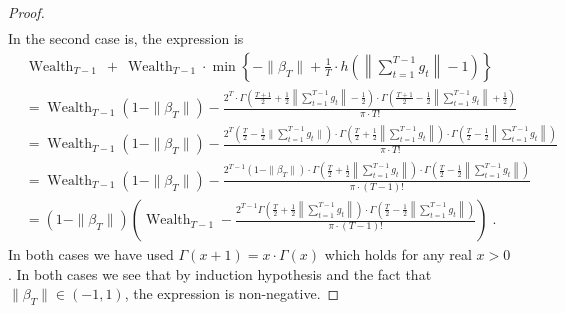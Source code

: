 \documentclass{article}
\DeclareMathOperator{\Wealth}{Wealth}
\begin{document}
\begin{proof}
\begin{align*}
\end{align*}
In the second case is, the expression is
\begin{align*}
& \Wealth_{T-1} \ + \ \Wealth_{T-1} \cdot \min \left\{ - \|\beta_T\| + \frac{1}{T} \cdot h\left(\left\|\sum_{t=1}^{T-1} g_t \right\| - 1 \right) \right\} \\
& = \Wealth_{T-1} (1 - \|\beta_T\|) - \frac{2^T \cdot \Gamma \left(\frac{T+1}{2} + \frac{1}{2}\left\|\sum_{t=1}^{T-1} g_t \right\| - \frac{1}{2} \right) \cdot \Gamma \left(\frac{T+1}{2} - \frac{1}{2} \left\|\sum_{t=1}^{T-1} g_t \right\| + \frac{1}{2} \right)}{\pi \cdot T!} \\
& = \Wealth_{T-1} (1 - \|\beta_T\|) - \frac{2^T \left( \frac{T}{2} - \frac{1}{2}\|\sum_{t=1}^{T-1} g_t\| \right) \cdot \Gamma \left(\frac{T}{2} + \frac{1}{2}\left\|\sum_{t=1}^{T-1} g_t \right\| \right) \cdot \Gamma \left(\frac{T}{2} - \frac{1}{2} \left\|\sum_{t=1}^{T-1} g_t \right\| \right)}{\pi \cdot T!} \\
& = \Wealth_{T-1} (1 - \|\beta_T\|) - \frac{2^{T-1} \left( 1 - \|\beta_T\| \right) \cdot \Gamma \left(\frac{T}{2} + \frac{1}{2}\left\|\sum_{t=1}^{T-1} g_t \right\| \right) \cdot \Gamma \left(\frac{T}{2} - \frac{1}{2} \left\|\sum_{t=1}^{T-1} g_t \right\| \right)}{\pi \cdot (T-1)!} \\
& = (1 - \|\beta_T\|) \left( \Wealth_{T-1}  - \frac{2^{T-1} \Gamma \left(\frac{T}{2} + \frac{1}{2}\left\|\sum_{t=1}^{T-1} g_t \right\| \right) \cdot \Gamma \left(\frac{T}{2} - \frac{1}{2} \left\|\sum_{t=1}^{T-1} g_t \right\| \right)}{\pi \cdot (T-1)!} \right) \; .
\end{align*}
In both cases we have used $\Gamma(x+1) = x \cdot \Gamma(x)$ which holds for any real $x > 0$.
In both cases we see that by induction hypothesis and the fact that $\|\beta_T\| \in (-1,1)$, the expression is non-negative.
\end{proof}
\end{document}
